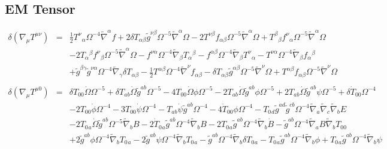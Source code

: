 \documentclass[10pt,letterpaper]{article}
\numberwithin{equation}{section}
\begin{document}
\subsection{EM Tensor}
\begin{eqnarray}
\delta(\nabla_\mu T^{\mu\nu}) &=& \tfrac{1}{2} T^{\nu }{}_{\alpha } \Omega^{-4} \tilde{\nabla}^{\alpha }f
+ 2 \delta T_{\alpha \beta } \tilde{g}^{\nu \beta } \Omega^{-5} \tilde{\nabla}^{\alpha }\Omega
- 2 T^{\nu \beta } f_{\alpha \beta } \Omega^{-5} \tilde{\nabla}^{\alpha }\Omega
+ T^{\beta }{}_{\beta } f^{\nu }{}_{\alpha } \Omega^{-5} \tilde{\nabla}^{\alpha }\Omega\nonumber\\
&& - 2 T_{\alpha }{}^{\beta } f^{\nu }{}_{\beta } \Omega^{-5} \tilde{\nabla}^{\alpha }\Omega
-  f^{\nu \alpha } \Omega^{-4} \tilde{\nabla}_{\beta }T_{\alpha }{}^{\beta }
-  f^{\alpha \beta } \Omega^{-4} \tilde{\nabla}_{\beta }T^{\nu }{}_{\alpha }
-  T^{\nu \alpha } \Omega^{-4} \tilde{\nabla}_{\beta }f_{\alpha }{}^{\beta }\nonumber\\
&& + \tilde{g}^{\beta \gamma } \tilde{g}^{\nu \alpha } \Omega^{-4} \tilde{\nabla}_{\gamma }\delta T_{\alpha \beta }
-  \tfrac{1}{2} T^{\alpha \beta } \Omega^{-4} \tilde{\nabla}^{\nu }f_{\alpha \beta }
-  \delta T_{\alpha \beta } \tilde{g}^{\alpha \beta } \Omega^{-5} \tilde{\nabla}^{\nu }\Omega
+ T^{\alpha \beta } f_{\alpha \beta } \Omega^{-5} \tilde{\nabla}^{\nu }\Omega 
\\ \nonumber\\
\delta(\nabla_\mu T^{\mu 0})&=& \delta T_{00}{} \dot{\Omega} \Omega^{-5} + \delta T_{ab} \dot{\Omega} \tilde{g}^{ab} \Omega^{-5} - 4 T_{00}{} \dot{\Omega} \phi \Omega^{-5} - 2 T_{ab} \dot{\Omega} \tilde{g}^{ab} \phi \Omega^{-5} + 2 T_{ab} \dot{\Omega} \tilde{g}^{ab} \psi \Omega^{-5} + \delta \dot{T}_{00}{} \Omega^{-4} \nonumber \\ 
&& - 2 T_{00}{} \dot{\phi} \Omega^{-4} - 3 T_{00}{} \dot{\psi} \Omega^{-4} -  T_{ab} \dot{\psi} \tilde{g}^{ab} \Omega^{-4} - 4 \dot{T}_{00}{} \phi \Omega^{-4} -  T_{0}{}_{d} \tilde{g}^{ad} \tilde{g}^{cb} \Omega^{-4} \tilde{\nabla}_{a}\tilde{\nabla}_{c}\tilde{\nabla}_{b}E \nonumber \\ 
&& - 2 T_{0}{}_{a} \dot{\Omega} \tilde{g}^{ab} \Omega^{-5} \tilde{\nabla}_{b}B - 2 \dot{T}_{0}{}_{a} \tilde{g}^{ab} \Omega^{-4} \tilde{\nabla}_{b}B - 2 T_{0}{}_{a} \tilde{g}^{ab} \Omega^{-4} \tilde{\nabla}_{b}\dot{B} -  \tilde{g}^{ab} \Omega^{-4} \tilde{\nabla}_{a}B \tilde{\nabla}_{b}T_{00}{} \nonumber \\ 
&& + 2 \tilde{g}^{ab} \phi \Omega^{-4} \tilde{\nabla}_{b}T_{0}{}_{a} - 2 \tilde{g}^{ab} \psi \Omega^{-4} \tilde{\nabla}_{b}T_{0}{}_{a} -  \tilde{g}^{ab} \Omega^{-4} \tilde{\nabla}_{b}\delta T_{0}{}_{a} -  T_{0}{}_{a} \tilde{g}^{ab} \Omega^{-4} \tilde{\nabla}_{b}\phi + T_{0}{}_{a} \tilde{g}^{ab} \Omega^{-4} \tilde{\nabla}_{b}\psi \nonumber \\ 

\end{eqnarray}
\end{document}

